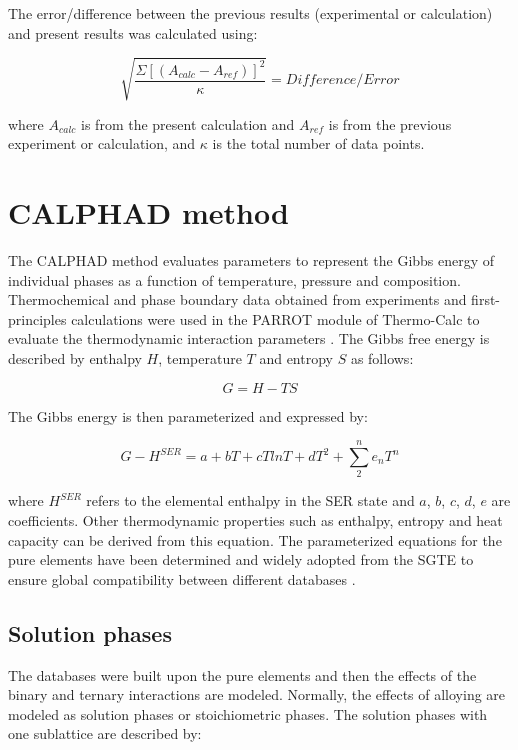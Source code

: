 The error/difference between the previous results (experimental or calculation) and present results was calculated using:

\begin{equation}
\label{eq: error}
\sqrt{\frac{\Sigma[(A_{calc}-A_{ref})]^{2}}{\kappa}} = Difference/Error
\end{equation}

\noindent where $A_{calc}$ is from the present calculation and $A_{ref}$ is from the previous experiment or calculation, and $\kappa$ is the total number of data points. 

\section{CALPHAD method}

The CALPHAD method evaluates parameters to represent the Gibbs energy of individual phases as a function of temperature, pressure and composition. Thermochemical and phase boundary data obtained from experiments and first-principles calculations were used in the PARROT module of Thermo-Calc to evaluate the thermodynamic interaction parameters \cite{Andersson2002}. The Gibbs free energy is described by enthalpy $H$, temperature $T$ and entropy $S$ as follows:

\begin{equation}
\label{eq: gibbs}
G = H - T S 
\end{equation}

\noindent The Gibbs energy is then parameterized and expressed by:

\begin{equation}
\label{eq: parameterizaiton}
G - H^{SER} = a + bT + cT ln T + d T^2 + \sum_{2}^{n} e_{n} T^{n}
\end{equation}

\noindent where $H^{SER}$ refers to the elemental enthalpy in the SER state and $a$, $b$, $c$, $d$, $e$ are coefficients. Other thermodynamic properties such as enthalpy, entropy and heat capacity can be derived from this equation. The parameterized equations for the pure elements have been determined and widely adopted from the SGTE to ensure global compatibility between different databases \cite{Dinsdale1991}.

\subsection{Solution phases}

The databases were built upon the pure elements and then the effects of the binary and ternary interactions are modeled. Normally, the effects of alloying are modeled as solution phases or stoichiometric phases. The solution phases with one sublattice are described by: 

